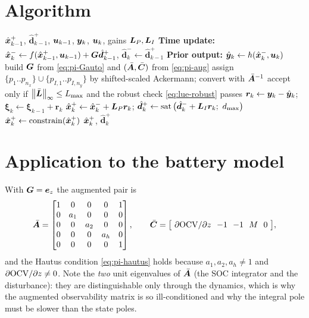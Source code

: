 \section{Algorithm}
\begin{algorithm}[H]
\caption{PI-Observer --- one sampling period}
\begin{algorithmic}[1]
\Require $\hat{\bm{x}}^{+}_{k-1}$, $\hat{\bm{d}}^+_{k-1}$, $\bm{u}_{k-1}$, $\bm{y}_k$, $\bm{u}_k$, gains $\bm{L}_P,\bm{L}_I$
\State \textbf{Time update:} $\hat{\bm{x}}^{-}_k \gets f(\hat{\bm{x}}^{+}_{k-1},\bm{u}_{k-1}) + \bm{G}\hat{\bm{d}}^+_{k-1}$, \quad $\hat{\bm{d}}^-_k \gets \hat{\bm{d}}^+_{k-1}$
\State \textbf{Prior output:} $\hat{\bm{y}}_k \gets h(\hat{\bm{x}}^{-}_k,\bm{u}_k)$
  \State build $\bm{G}$ from \eqref{eq:pi-Gauto} and $(\bar{\bm{A}},\bar{\bm{C}})$ from \eqref{eq:pi-aug}
  \State assign $\{p_1..p_{n_x}\}\cup\{p_{I,1}..p_{I,n_y}\}$ by shifted-scaled Ackermann; convert with $\bar{\bm{A}}^{-1}$
  \State accept only if $\left\lVert \bar{\bm{L}} \right\rVert_\infty \le L_{\max}$ and the robust check \eqref{eq:lue-robust} passes
\EndIf
\State $\bm{r}_k \gets \bm{y}_k - \hat{\bm{y}}_k$; \quad $\bm{\xi}_k \gets \bm{\xi}_{k-1} + \bm{r}_k$
\State $\hat{\bm{x}}^{+}_k \gets \hat{\bm{x}}^{-}_k + \bm{L}_P\bm{r}_k$; \quad $\hat{\bm{d}}^+_k \gets \operatorname{sat}\big(\hat{\bm{d}}^-_k + \mL_I\bm{r}_k;\ d_{\max}\big)$
\State $\hat{\bm{x}}^{+}_k \gets \operatorname{constrain}(\hat{\bm{x}}^{+}_k)$
\Ensure $\hat{\bm{x}}^{+}_k$, $\hat{\bm{d}}^+_k$
\end{algorithmic}
\end{algorithm}

\section{Application to the battery model}
With $\bm{G} = \bm{e}_{z}$ the augmented pair is
\begin{equation}
\bar{\mA} = \begin{bmatrix}1&0&0&0&1\\0&a_1&0&0&0\\0&0&a_2&0&0\\0&0&0&a_h&0\\0&0&0&0&1\end{bmatrix},
\qquad
\bar{\mC} = \big[\ \partial\ocv/\partial\soc\ \ {-1}\ \ {-1}\ \ M\ \ 0\ \big] ,
\label{eq:pi-cell}
\end{equation}
and the Hautus condition \eqref{eq:pi-hautus} holds because $a_1,a_2,a_h\neq 1$ and
$\partial\mathrm{OCV}/\partial z\neq 0$.  Note the \emph{two} unit eigenvalues of $\bar{\bm{A}}$ (the SOC
integrator and the disturbance): they are distinguishable only through the dynamics, which is
why the augmented observability matrix is so ill-conditioned and why the integral pole must be
slower than the state poles.

